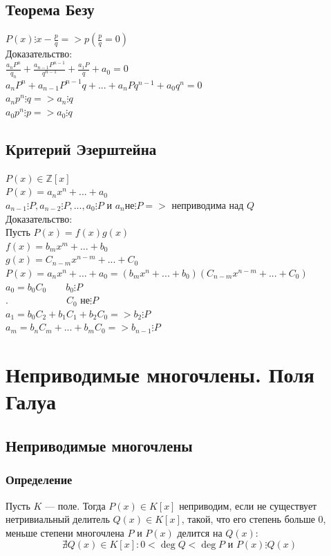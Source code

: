 \documentclass[12pt]{article}
\begin{document}
    \subsection{Теорема Безу}
    \noindent $P(x) \vdots x - \frac{p}{q} => p(\frac{p}{q} = 0)$
    \\Доказательство:
    \\$\frac{a_nP^n}{q_n}+\frac{a_{n-1}P^{n-1}}{q^{n-1}}+\frac{a_1P}{q}+a_0=0$
\\$a_nP^n+a_{n-1}P^{n-1}q+...+a_nPq^{n-1}+a_0q^n=0$
    \\$a_np^n \vdots q => a_n \vdots q$
\\$a_0p^n \vdots p => a_0 \vdots q$
    \subsection{Критерий Эзерштейна}
    \noindent $P(x) \in \mathbb{Z}[x]$
    \\$P(x) = a_nx^n+...+a_0$
\\$a_{n-1}\vdots P, a_{n-2} \vdots P,...,a_0\vdots P$ и $a_n$не$\vdots P=>$ неприводима над $Q$
    \\Доказательство:
    \\Пусть $P(x) = f(x)g(x)$
    \\$f(x) = b_mx^m+...+b_0$
\\$g(x) = C_{n-m}x^{n-m}+...+C_0$
    \\$P(x) = a_nx^n+...+a_0=(b_mx^n+...+b_0)(C_{n-m}x^{n-m}+...+C_0)$
\\$a_0=b_0C_0 \qquad b_0 \vdots P$
    \\$. \hspace{6em}C_0$ не$ \vdots P$
\\$a_1=b_0C_2+b_1C_1+b_2C_0 => b_2\vdots P $
    \\$a_m=b_nC_m+...+b_mC_0 => b_{n-1}\vdots P $

\setcounter{section}{12}
\section{Неприводимые многочлены. Поля Галуа}
\subsection{Неприводимые многочлены}
\subsubsection{Определение}
Пусть $K$ — поле. Тогда $P(x) \in K[x]$ неприводим, если не существует нетривиальный делитель $Q(x) \in K[x]$, такой, что его степень больше 0, меньше степени многочлена $P$ и $P(x)$ делится на $Q(x)$:
\[
    \nexists Q(x) \in K[x] : 0 < \deg Q < \deg P \text{ и } P(x) \vdots Q(x)
\]
\end{document}
